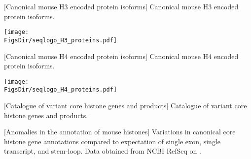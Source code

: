  \newpage
  \begin{minipage}{\textwidth}
  \begin{center}
  [Canonical mouse H3 encoded protein isoforms]%
                   {Canonical mouse H3 encoded protein isoforms.}
  
  \texttt{[image: \\FigsDir/seqlogo\_H3\_proteins.pdf]}
  \end{center}
  \end{minipage}

  \newpage
  \begin{minipage}{\textwidth}
  \begin{center}
  [Canonical mouse H4 encoded protein isoforms]%
                   {Canonical mouse H4 encoded protein isoforms.}
  
  \texttt{[image: \\FigsDir/seqlogo\_H4\_proteins.pdf]}
  \end{center}
  \end{minipage}

  \newpage
  \begin{center}
  [Catalogue of variant core histone genes and products]%
                   {Catalogue of variant core histone genes and products.}
  
  \end{center}

  \newpage
  \begin{center}
    [Anomalies in the annotation of mouse histones]{
        Variations in canonical core histone gene annotations
        compared to expectation of single exon, single transcript,
        and stem-loop.
        Data obtained from NCBI RefSeq \citep{OLearyRefseq2016} on
        \SequencesDate{}.
    }
  \begin{itemize}
  
  \end{itemize}
  \end{center}
